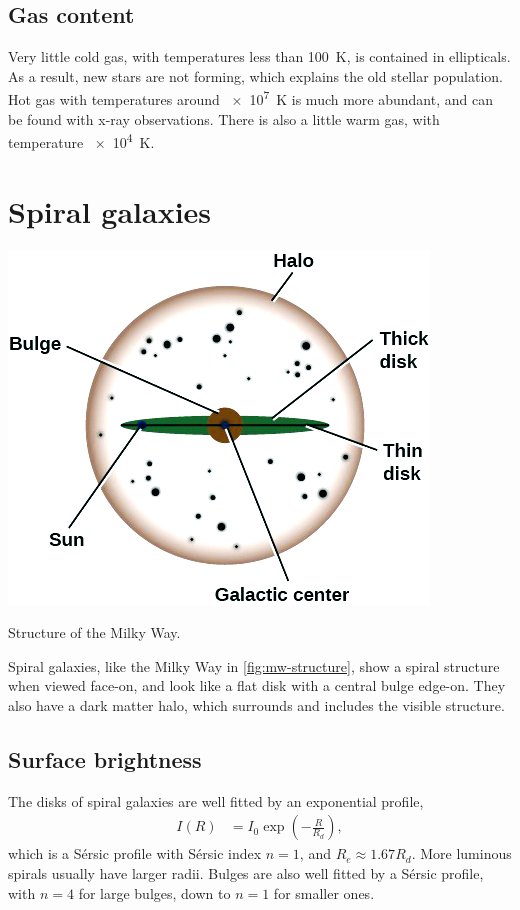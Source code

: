\subsection{Gas content}
Very little cold gas, with temperatures less than \SI{100}{\kelvin}, is contained in ellipticals.
As a result, new stars are not forming, which explains the old stellar population.
Hot gas with temperatures around \SI{e7}{\kelvin} is much more abundant, and can be found with x-ray observations.
There is also a little warm gas, with temperature \SI{e4}{\kelvin}.







\section{Spiral galaxies}
\begin{marginfigure}
	\includegraphics[width=\textwidth]{img/ch-05/milky-way.png}
	\caption{Structure of the Milky Way.}
	\label{fig:mw-structure}
\end{marginfigure}
Spiral galaxies, like the Milky Way in \cref{fig:mw-structure}, show a spiral structure when viewed face-on, and look like a flat disk with a central bulge edge-on.
They also have a dark matter halo, which surrounds and includes the visible structure.

\subsection{Surface brightness}
The disks of spiral galaxies are well fitted by an exponential profile,
\begin{align*}
	I(R)
	&= I_0 \exp\left( -\frac{R}{R_d} \right),
\end{align*}
which is a Sérsic profile with Sérsic index $n=1$,
and $R_e \approx 1.67 R_d$.
More luminous spirals usually have larger radii.
Bulges are also well fitted by a Sérsic profile, with $n = 4$ for large bulges, down to $n=1$ for smaller ones.

